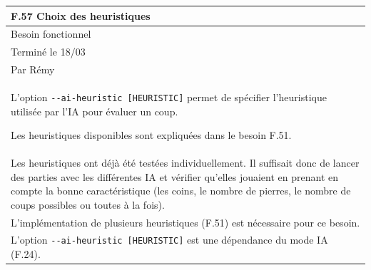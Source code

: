 \documentclass[a4paper,12pt]{article}
\begin{document}
\noindent
\setlength{\arrayrulewidth}{1.5pt}
\renewcommand{\arraystretch}{1.5}
\begin{tabularx}{\textwidth}{|X|}
    \hline
    \textbf{F.57 Choix des heuristiques}                              \\
    \hline
    Besoin fonctionnel                                                \\
    \hline
    Terminé le 18/03                                                  \\
    Par Rémy                                                          \\
    \hline
    L’option \texttt{-}\texttt{-ai-heuristic [HEURISTIC]} permet de spécifier l’heuristique utilisée par l’IA pour évaluer un coup.

    Les heuristiques disponibles sont expliquées dans le besoin F.51. \\
    \arrayrulecolor{MediumAquamarine}\hline \arrayrulecolor{CornflowerBlue} Les
    heuristiques ont déjà été testées individuellement. Il suffisait donc de lancer
    des parties avec les différentes IA et vérifier qu’elles jouaient en prenant en
    compte la bonne caractéristique (les coins, le nombre de pierres, le nombre de
    coups possibles ou toutes à la fois).                             \\
    \arrayrulecolor{MediumAquamarine}\hline \arrayrulecolor{CornflowerBlue}
    L'implémentation de plusieurs heuristiques (F.51) est nécessaire pour ce
    besoin.                                                           \\ L'option \texttt{-}\texttt{-ai-heuristic [HEURISTIC]} est une
    dépendance du mode IA (F.24).                                     \\ \hline
\end{tabularx}

\vspace{1cm}
\end{document}
